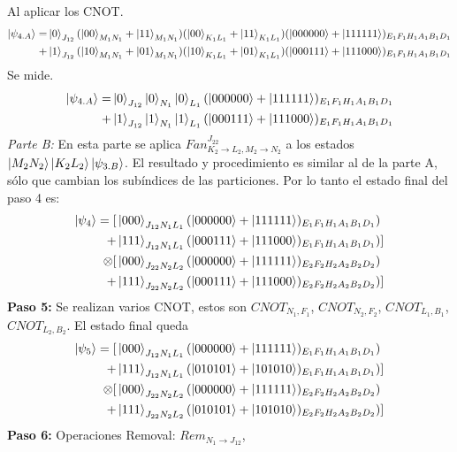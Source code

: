 Al aplicar los CNOT.
\begin{align*}
\ket{\psi_{4.A}} = & \ket{0}_{J_{12}}(\ket{00}_{M_1 N_1}+\ket{11}_{M_1 N_1})(\ket{00}_{K_1 L_1}+\ket{11}_{K_1 L_1})(\ket{000000}+\ket{111111})_{E_1 F_1 H_1 A_1 B_1 D_1} \\
 +&\ket{1}_{J_{12}}(\ket{10}_{M_1 N_1}+\ket{01}_{M_1 N_1})(\ket{10}_{K_1 L_1}+\ket{01}_{K_1 L_1})(\ket{000111}+\ket{111000})_{E_1 F_1 H_1 A_1 B_1 D_1}
\end{align*}
Se mide.
\begin{align*}
\ket{\psi_{4.A}} =  & \ket{0}_{J_{12}}\ket{0}_{N_1}\ket{0}_{L_1}(\ket{000000}+\ket{111111})_{E_1 F_1 H_1 A_1 B_1 D_1} \\
 +&\ket{1}_{J_{12}}\ket{1}_{N_1}\ket{1}_{L_1}(\ket{000111}+\ket{111000})_{E_1 F_1 H_1 A_1 B_1 D_1}
\end{align*}
\textit{Parte B:} En esta parte se aplica $Fan^{J_{22}}_{K_2  \rightarrow L_2 , M_2  \rightarrow N_2}$ a los estados $\ket{M_2 N_2}\ket{K_2 L_2}\ket{\psi_{3.B}}$. El resultado y procedimiento es similar al de la parte A, sólo que cambian los subíndices de las particiones. Por lo tanto el estado final del paso 4 es:
\begin{align*}
\ket{\psi_4} = [ 
  & \ket{000}_{J_{12} N_1 L_1}(\ket{000000}+\ket{111111})_{E_1 F_1 H_1 A_1 B_1 D_1}) \\
+ & \ket{111}_{J_{12} N_1 L_1}(\ket{000111}+\ket{111000})_{E_1 F_1 H_1 A_1 B_1 D_1})] \\ \otimes 
[ & \ket{000}_{J_{22} N_2 L_2}(\ket{000000}+\ket{111111})_{E_2 F_2 H_2 A_2 B_2 D_2}) \\
+ & \ket{111}_{J_{22} N_2 L_2}(\ket{000111}+\ket{111000})_{E_2 F_2 H_2 A_2 B_2 D_2}) ]
\end{align*}
\textbf{Paso 5:} Se realizan varios CNOT, estos son $CNOT_{N_1 , F_1}$, 
$CNOT_{N_2 , F_2}$, 
$CNOT_{L_1 , B_1}$, 
$CNOT_{L_2 , B_2}$. El estado final queda
\begin{align*}
\ket{\psi_5} = [ 
  & \ket{000}_{J_{12} N_1 L_1}(\ket{000000}+\ket{111111})_{E_1 F_1 H_1 A_1 B_1 D_1}) \\
+ & \ket{111}_{J_{12} N_1 L_1}(\ket{010101}+\ket{101010})_{E_1 F_1 H_1 A_1 B_1 D_1}) ]\\ \otimes 
[ & \ket{000}_{J_{22} N_2 L_2}(\ket{000000}+\ket{111111})_{E_2 F_2 H_2 A_2 B_2 D_2}) \\
+ & \ket{111}_{J_{22} N_2 L_2}(\ket{010101}+\ket{101010})_{E_2 F_2 H_2 A_2 B_2 D_2}) ]
\end{align*}
\textbf{Paso 6:} Operaciones Removal: $Rem_{N_1 \rightarrow J_{12}}$, 
